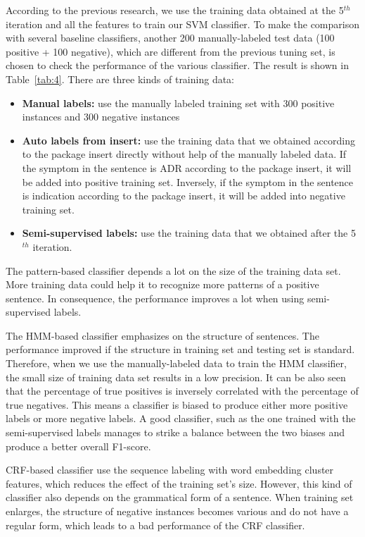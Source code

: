 According to the previous research, we use the training data obtained at the 5$^{th}$ iteration and all the features to train our SVM classifier. To make the comparison with several baseline classifiers, another 200 manually-labeled test data (100 positive + 100 negative), which are different from the previous tuning set, is chosen to check the performance of the various classifier. The result is shown in Table~\ref{tab:4}. There are three kinds of training data:

\begin{itemize}
	\item \textbf{Manual labels:} use the manually labeled training set with 300 positive instances and 300 negative instances
	\item \textbf{Auto labels from insert:} use the  training data that we obtained according to the package insert directly without help of the manually labeled data. If the symptom in the sentence is ADR according to the package insert, it will be added into positive training set. Inversely, if the symptom in the sentence is indication according to the package insert, it will be added into negative training set. 
	\item \textbf{Semi-supervised labels:} use the training data that we obtained after the 5$^{th}$ iteration.
\end{itemize}

The pattern-based classifier depends a lot on the size of the training data set. More training data could help it to recognize more patterns of a positive sentence. In consequence, the performance improves a lot when using semi-supervised labels.

The HMM-based classifier emphasizes on the structure of sentences. The performance improved if the structure in training set and testing set is standard. Therefore, when we use the manually-labeled data to train the HMM classifier, the small size of training data set results in a low precision. It can be also seen that the percentage of true positives is inversely correlated with the percentage of true negatives. This means a classifier is biased to produce either more positive labels or more negative labels. A good classifier, such as the one trained with the semi-supervised labels manages to strike a balance between the two biases and produce a better overall F1-score.

CRF-based classifier use the sequence labeling with word embedding cluster features, which reduces the effect of the training set’s size. However, this kind of classifier also depends on the grammatical form of a sentence. When training set enlarges, the structure of negative instances becomes various and do not have a regular form, which leads to a bad performance of the CRF classifier.

